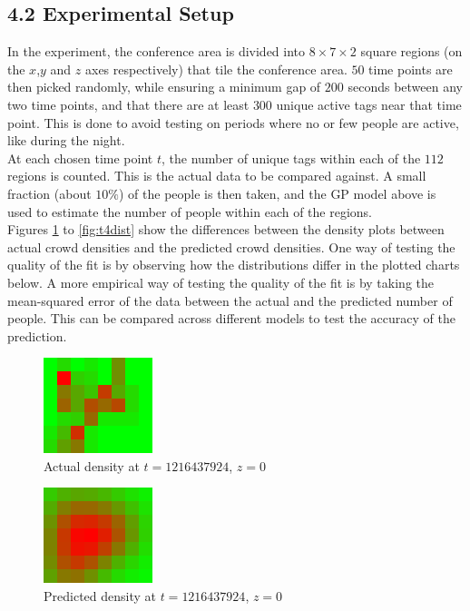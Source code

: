 \documentclass[letterpaper]{article}
\begin{document}
\subsection{4.2  Experimental Setup}

In the experiment, the conference area is divided into $8\times 7 \times 2$ square regions (on the $x$,$y$ and $z$ axes respectively) that tile the conference area. $50$ time points are then picked randomly, while ensuring a minimum gap of $200$ seconds between any two time points, and that there are at least $300$ unique active tags near that time point. This is done to avoid testing on periods where no or few people are active, like during the night.\\

At each chosen time point $t$, the number of unique tags within each of the $112$ regions is counted. This is the actual data to be compared against. A small fraction (about $10\%$) of the people is then taken, and the GP model above is used to estimate the number of people within each of the regions. \\

Figures \ref{fig:t1dist} to \ref{fig:t4dist} show the differences between the density plots between actual crowd densities and the predicted crowd densities. One way of testing the quality of the fit is by observing how the distributions differ in the plotted charts below. A more empirical way of testing the quality of the fit is by taking the mean-squared error of the data between the actual and the predicted number of people. This can be compared across different models to test the accuracy of the prediction.

\begin{figure}[h!]
  \centering
    \includegraphics[width=120px,natwidth=320,natheight=280]{selected_renders/0_1216437924.png}
  \caption{Actual density at $t=1216437924$, $z=0$}
  \label{fig:t1dist}
\end{figure}

\begin{figure}[h!]
  \centering
    \includegraphics[width=120px,natwidth=320,natheight=280]{selected_renders/0_1216437924p.png}
  \caption{Predicted density at $t=1216437924$, $z=0$}
  \label{fig:t2dist}
\end{figure}
\end{document}
